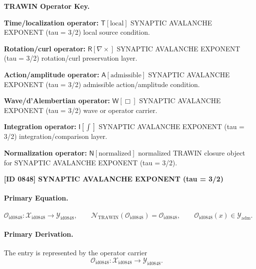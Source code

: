 \par\vspace{0.45\baselineskip}
\noindent\begin{minipage}[t]{\linewidth}
\begingroup
\small
\raggedright
\textbf{TRAWIN Operator Key.}\par
\noindent\textbf{Time/localization operator:} $\mathsf{T}\!\left[\mathrm{local}\right]$ SYNAPTIC AVALANCHE EXPONENT (tau = 3/2) local source condition.\par
\noindent\textbf{Rotation/curl operator:} $\mathsf{R}\!\left[\nabla\times\right]$ SYNAPTIC AVALANCHE EXPONENT (tau = 3/2) rotation/curl preservation layer.\par
\noindent\textbf{Action/amplitude operator:} $\mathsf{A}\!\left[\mathrm{admissible}\right]$ SYNAPTIC AVALANCHE EXPONENT (tau = 3/2) admissible action/amplitude condition.\par
\noindent\textbf{Wave/d'Alembertian operator:} $\mathsf{W}\!\left[\Box\right]$ SYNAPTIC AVALANCHE EXPONENT (tau = 3/2) wave or operator carrier.\par
\noindent\textbf{Integration operator:} $\mathsf{I}\!\left[\int\right]$ SYNAPTIC AVALANCHE EXPONENT (tau = 3/2) integration/comparison layer.\par
\noindent\textbf{Normalization operator:} $\mathsf{N}\!\left[\mathrm{normalized}\right]$ normalized TRAWIN closure object for SYNAPTIC AVALANCHE EXPONENT (tau = 3/2).\par
\endgroup
\end{minipage}

\clearpage
\noindent\textbf{[ID 0848] SYNAPTIC AVALANCHE EXPONENT (tau = 3/2)}\par
\vspace{0.35em}
\paragraph{Primary Equation.}
\[
\mathcal{O}_{\mathrm{id0848}}:\mathcal{X}_{\mathrm{id0848}}\longrightarrow \mathcal{Y}_{\mathrm{id0848}},\qquad
\mathcal{N}_{\mathrm{TRAWIN}}(\mathcal{O}_{\mathrm{id0848}})=\mathcal{O}_{\mathrm{id0848}},\qquad
\mathcal{O}_{\mathrm{id0848}}(x)\in\mathcal{Y}_{\mathrm{adm}}.
\]

\paragraph{Primary Derivation.} The entry is represented by the operator carrier\[
\mathcal{O}_{\mathrm{id0848}}:\mathcal{X}_{\mathrm{id0848}}\longrightarrow \mathcal{Y}_{\mathrm{id0848}}.
\]

